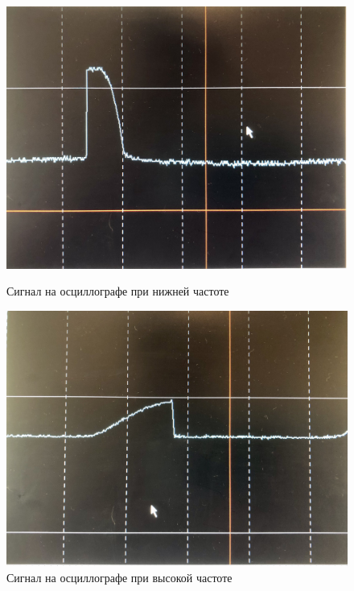 \documentclass[a4paper]{article}
\begin{document}
\begin{enumerate}
        \begin{figure}[H]
            \begin{center}
            \begin{minipage}[h]{0.4\linewidth}
            \includegraphics[width=1\linewidth]{f_n.jpg}
            \caption{Сигнал на осциллографе при нижней частоте} 
            \label{f_n}
            \end{minipage}
            \hfill 
            \begin{minipage}[h]{0.45\linewidth}
            \includegraphics[width=1\linewidth]{f_v.jpg}
            \caption{Сигнал на осциллографе при высокой частоте}
            \label{f_v}
            \end{minipage}
            \end{center}
        \end{figure}


\end{enumerate}
\end{document}
